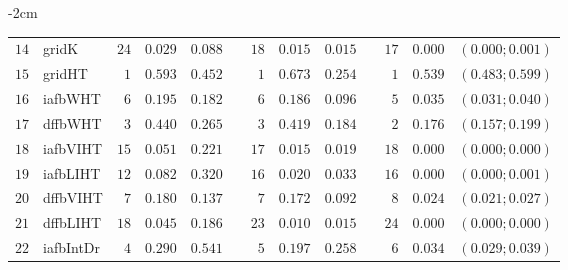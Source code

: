 \begin{table*}[!htbp]
\begin{adjustwidth*}{}{-2cm}
\begin{tabular}{@{}rlrrrrrrrrrcc@{}}
\footnotesize{$14$} & \footnotesize{gridK    } & \footnotesize{$24$} & \footnotesize{$0.029$} & \footnotesize{$0.088$} && \footnotesize{$18$} & \footnotesize{$0.015$} & \footnotesize{$0.015$} && \footnotesize{$17$} & \footnotesize{$0.000$} & \footnotesize{$(0.000;0.001)$} \\
\footnotesize{$15$} & \footnotesize{gridHT   } & \footnotesize{$1 $} & \footnotesize{$0.593$} & \footnotesize{$0.452$} && \footnotesize{$1 $} & \footnotesize{$0.673$} & \footnotesize{$0.254$} && \footnotesize{$1 $} & \footnotesize{$0.539$} & \footnotesize{$(0.483;0.599)$} \\
\footnotesize{$16$} & \footnotesize{iafbWHT  } & \footnotesize{$6 $} & \footnotesize{$0.195$} & \footnotesize{$0.182$} && \footnotesize{$6 $} & \footnotesize{$0.186$} & \footnotesize{$0.096$} && \footnotesize{$5 $} & \footnotesize{$0.035$} & \footnotesize{$(0.031;0.040)$} \\
\footnotesize{$17$} & \footnotesize{dffbWHT  } & \footnotesize{$3 $} & \footnotesize{$0.440$} & \footnotesize{$0.265$} && \footnotesize{$3 $} & \footnotesize{$0.419$} & \footnotesize{$0.184$} && \footnotesize{$2 $} & \footnotesize{$0.176$} & \footnotesize{$(0.157;0.199)$} \\
\footnotesize{$18$} & \footnotesize{iafbVIHT } & \footnotesize{$15$} & \footnotesize{$0.051$} & \footnotesize{$0.221$} && \footnotesize{$17$} & \footnotesize{$0.015$} & \footnotesize{$0.019$} && \footnotesize{$18$} & \footnotesize{$0.000$} & \footnotesize{$(0.000;0.000)$} \\
\footnotesize{$19$} & \footnotesize{iafbLIHT } & \footnotesize{$12$} & \footnotesize{$0.082$} & \footnotesize{$0.320$} && \footnotesize{$16$} & \footnotesize{$0.020$} & \footnotesize{$0.033$} && \footnotesize{$16$} & \footnotesize{$0.000$} & \footnotesize{$(0.000;0.001)$} \\
\footnotesize{$20$} & \footnotesize{dffbVIHT } & \footnotesize{$7 $} & \footnotesize{$0.180$} & \footnotesize{$0.137$} && \footnotesize{$7 $} & \footnotesize{$0.172$} & \footnotesize{$0.092$} && \footnotesize{$8 $} & \footnotesize{$0.024$} & \footnotesize{$(0.021;0.027)$} \\
\footnotesize{$21$} & \footnotesize{dffbLIHT } & \footnotesize{$18$} & \footnotesize{$0.045$} & \footnotesize{$0.186$} && \footnotesize{$23$} & \footnotesize{$0.010$} & \footnotesize{$0.015$} && \footnotesize{$24$} & \footnotesize{$0.000$} & \footnotesize{$(0.000;0.000)$} \\
\footnotesize{$22$} & \footnotesize{iafbIntDr} & \footnotesize{$4 $} & \footnotesize{$0.290$} & \footnotesize{$0.541$} && \footnotesize{$5 $} & \footnotesize{$0.197$} & \footnotesize{$0.258$} && \footnotesize{$6 $} & \footnotesize{$0.034$} & \footnotesize{$(0.029;0.039)$} \\

\end{tabular}
\end{adjustwidth*}
\end{table*}
